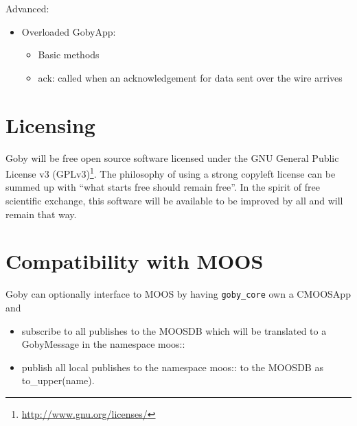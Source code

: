 \documentclass[10pt,letterpaper]{article}
\begin{document}
Advanced:
\begin{itemize}
\item Overloaded GobyApp:
\begin{itemize}
\item Basic methods
\item ack: called when an acknowledgement for data sent over the wire arrives
\end{itemize}
\end{itemize}



\section{Licensing}
Goby will be free open source software licensed under the GNU General Public License v3 (GPLv3)\footnote{\url{http://www.gnu.org/licenses/}}. The philosophy of using a strong copyleft license can be summed up with ``what starts free should remain free''. In the spirit of free scientific exchange, this software will be available to be improved by all and will remain that way.

\section{Compatibility with MOOS}
Goby can optionally interface to MOOS by having \verb|goby_core| own a CMOOSApp and 
\begin{itemize}
\item subscribe to all publishes to the MOOSDB which will be translated to a GobyMessage in the namespace moos::
\item publish all local publishes to the namespace moos:: to the MOOSDB as to\_upper(name).
\end{itemize}
\end{document}

